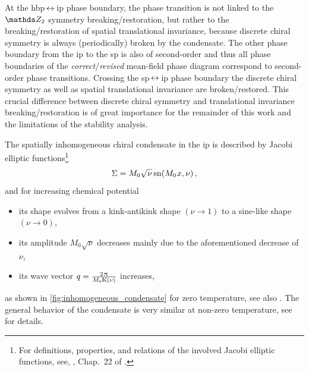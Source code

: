 At the \gls{hbp}$\,\leftrightarrow\,$\gls{ip} phase boundary, the phase transition is not linked to the $\Z_2$ symmetry breaking/restoration, but rather to the breaking/restoration of spatial translational invariance, because discrete chiral symmetry is always (periodically) broken by the condensate.
The other phase boundary from the  \gls{ip} to the \gls{sp} is also of second-order and thus all phase boundaries of the \emph{correct}/\emph{revised} mean-field phase diagram correspond to second-order phase transitions.
Crossing the \gls{sp}$\,\leftrightarrow\,$\gls{ip} phase boundary the discrete chiral symmetry as well as spatial translational invariance are broken/restored.
This crucial difference between discrete chiral symmetry and translational invariance breaking/restoration is of great importance for the remainder of this work and the limitations of the stability analysis.
	
The spatially inhomogeneous chiral condensate in the \gls{ip} is described by Jacobi elliptic functions\footnote{For definitions, properties, and relations of the involved Jacobi elliptic functions, see, \eg{}, Chap.~22 of .}
\begin{align}
\Sigma = M_0 \sqrt{\nu}\, \mathrm{sn}(M_0 \mskip1.0mu x,\nu)\,,
\label{eq:Msn}
\end{align}
and for increasing chemical potential 
\begin{itemize}
	\item its shape evolves from a kink-antikink shape $(\nu\rightarrow 1)$ to a sine-like shape  $(\nu\rightarrow 0)$,
	
	\item its amplitude $M_0\sqrt{\nu}$ decreases \dash{} mainly due to the aforementioned decrease of $\nu$,
	
	\item its wave vector $q=\frac{2\mkern1.0mu\uppi\mkern1.0mu}{M_0 \mathrm{K}(\nu)}$ increases,
\end{itemize}
as shown in \cref{fig:inhomogeneous_condensate} for zero temperature, see also .
The general behavior of the condensate is very similar at non-zero temperature, see  for details.

